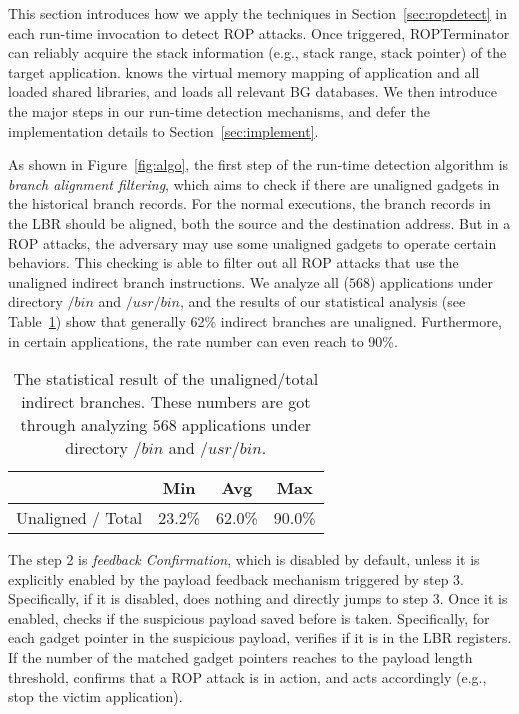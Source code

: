 This section introduces how we apply the techniques in Section~\ref{sec:ropdetect}
in each run-time \name invocation to detect ROP attacks.
Once triggered, ROPTerminator can reliably acquire the stack information (e.g.,
stack range, stack pointer) of the target application. \name knows
the virtual memory mapping of application and all loaded shared libraries, and loads all relevant BG databases. We then introduce
the major steps in our run-time detection mechanisms, and defer
the implementation details to Section~\ref{sec:implement}.

As shown in Figure~\ref{fig:algo}, the first step of the run-time detection algorithm
is {\em branch alignment filtering}, which aims to check if there are
unaligned gadgets in the historical branch records. For the normal executions,
the branch records in the LBR should be aligned, both the source and the destination
address. But in a ROP attacks, the adversary may use some unaligned gadgets to
operate certain behaviors.
This checking is able to filter out all ROP attacks that use the unaligned indirect branch instructions.
We analyze all ($568$) applications under directory $/bin$ and $/usr/bin$, and the
results of our statistical analysis (see Table~\ref{tab:unaligned}) show that generally 62\% indirect branches are unaligned. Furthermore, in certain applications, the rate number can even reach to 90\%.

\begin{table}
  \centering
  \begin{tabular}{|c|c|c|c|}
     \hline
      & Min & Avg & Max \\ \hline
      Unaligned / Total & 23.2\% & 62.0\% & 90.0\% \\
     \hline
   \end{tabular}
  \caption{The statistical result of the unaligned/total indirect branches. These numbers are got through analyzing $568$ applications under directory $/bin$ and $/usr/bin$.}\label{tab:unaligned}
\end{table}

The step 2 is {\em feedback Confirmation}, which is disabled by default, unless it is explicitly enabled by the payload feedback mechanism triggered by step 3. Specifically, if it is disabled, \name does nothing and directly jumps to step 3.
Once it is enabled, \name checks if the suspicious payload saved before is taken. 
Specifically, for each gadget pointer in the suspicious payload, \name verifies if it is in the LBR registers.
If the number of the matched gadget pointers reaches to the payload length threshold,
\name confirms that a ROP attack is in action, and acts accordingly (e.g.,
stop the victim application).

